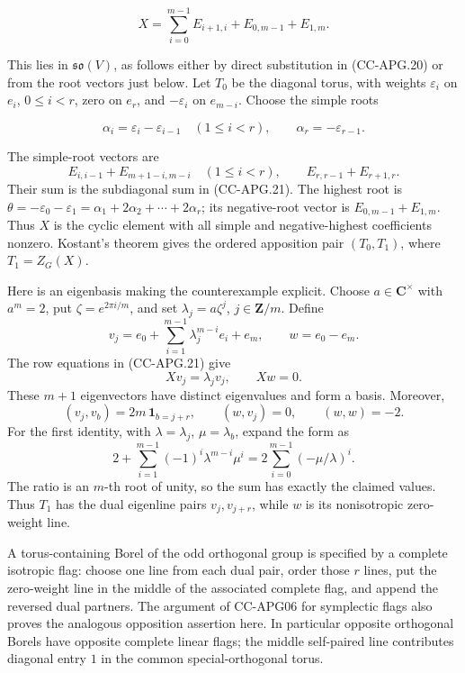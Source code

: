 \[
 X=\sum_{i=0}^{m-1}E_{i+1,i}
       +E_{0,m-1}+E_{1,m}.
 \tag{CC-APG.21}
\]

This lies in \(\mathfrak{so}(V)\), as follows either by direct
substitution in (CC-APG.20) or from the root vectors just below. Let
\(T_0\) be the diagonal torus, with weights \(\varepsilon_i\) on
\(e_i\), \(0\leq i<r\), zero on \(e_r\), and \(-\varepsilon_i\) on
\(e_{m-i}\). Choose the simple roots

\[
 \alpha_i=\varepsilon_i-\varepsilon_{i-1}\quad(1\leq i<r),
 \qquad \alpha_r=-\varepsilon_{r-1}.
\]

The simple-root vectors are \[
 E_{i,i-1}+E_{m+1-i,m-i}\quad(1\leq i<r),
 \qquad E_{r,r-1}+E_{r+1,r}.
\] Their sum is the subdiagonal sum in (CC-APG.21). The highest root is
\(\theta=-\varepsilon_0-\varepsilon_1
=\alpha_1+2\alpha_2+\cdots+2\alpha_r\); its negative-root vector is
\(E_{0,m-1}+E_{1,m}\). Thus \(X\) is the cyclic element with all simple
and negative-highest coefficients nonzero. Kostant's theorem gives the
ordered apposition pair \((T_0,T_1)\), where \(T_1=Z_G(X)\).

Here is an eigenbasis making the counterexample explicit. Choose
\(a\in\mathbf C^\times\) with \(a^m=2\), put \(\zeta=e^{2\pi i/m}\), and
set \(\lambda_j=a\zeta^j\), \(j\in\mathbf Z/m\). Define \[
 v_j=e_0+\sum_{i=1}^{m-1}\lambda_j^{m-i}e_i+e_m,
 \qquad w=e_0-e_m.
 \tag{CC-APG.22}
\] The row equations in (CC-APG.21) give \[
 Xv_j=\lambda_jv_j,\qquad Xw=0.
\] These \(m+1\) eigenvectors have distinct eigenvalues and form a
basis. Moreover, \[
 (v_j,v_b)=2m\,\mathbf 1_{b=j+r},\qquad
 (w,v_j)=0,\qquad(w,w)=-2.
 \tag{CC-APG.23}
\] For the first identity, with \(\lambda=\lambda_j\),
\(\mu=\lambda_b\), expand the form as \[
 2+\sum_{i=1}^{m-1}(-1)^i\lambda^{m-i}\mu^i
   =2\sum_{i=0}^{m-1}(-\mu/\lambda)^i.
\] The ratio is an \(m\)-th root of unity, so the sum has exactly the
claimed values. Thus \(T_1\) has the dual eigenline pairs
\(v_j,v_{j+r}\), while \(w\) is its nonisotropic zero-weight line.

A torus-containing Borel of the odd orthogonal group is specified by a
complete isotropic flag: choose one line from each dual pair, order
those \(r\) lines, put the zero-weight line in the middle of the
associated complete flag, and append the reversed dual partners. The
argument of CC-APG06 for symplectic flags also proves the analogous
opposition assertion here. In particular opposite orthogonal Borels have
opposite complete linear flags; the middle self-paired line contributes
diagonal entry \(1\) in the common special-orthogonal torus.

